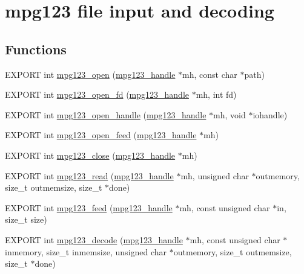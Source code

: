 \hypertarget{group__mpg123__input}{}\section{mpg123 file input and decoding}
\label{group__mpg123__input}
\subsection*{Functions}
\begin{DoxyCompactItemize}
\item 
E\+X\+P\+O\+RT int \hyperlink{group__mpg123__input_gaf36f3b37e964dd0409b468c71c7c5f4e}{mpg123\+\_\+open} (\hyperlink{group__mpg123__init_ga6728e2839a395f3a07d4514da659faca}{mpg123\+\_\+handle} $\ast$mh, const char $\ast$path)
\item 
E\+X\+P\+O\+RT int \hyperlink{group__mpg123__input_gaf205cf0e2c2a6612f564b17d50d227f4}{mpg123\+\_\+open\+\_\+fd} (\hyperlink{group__mpg123__init_ga6728e2839a395f3a07d4514da659faca}{mpg123\+\_\+handle} $\ast$mh, int fd)
\item 
E\+X\+P\+O\+RT int \hyperlink{group__mpg123__input_gad6637826d5288242db3eef0ba6c421ba}{mpg123\+\_\+open\+\_\+handle} (\hyperlink{group__mpg123__init_ga6728e2839a395f3a07d4514da659faca}{mpg123\+\_\+handle} $\ast$mh, void $\ast$iohandle)
\item 
E\+X\+P\+O\+RT int \hyperlink{group__mpg123__input_gafa7b573253221fa87df7087110529cce}{mpg123\+\_\+open\+\_\+feed} (\hyperlink{group__mpg123__init_ga6728e2839a395f3a07d4514da659faca}{mpg123\+\_\+handle} $\ast$mh)
\item 
E\+X\+P\+O\+RT int \hyperlink{group__mpg123__input_ga1c86c6042807ab7734b67a829ee7a2e7}{mpg123\+\_\+close} (\hyperlink{group__mpg123__init_ga6728e2839a395f3a07d4514da659faca}{mpg123\+\_\+handle} $\ast$mh)
\item 
E\+X\+P\+O\+RT int \hyperlink{group__mpg123__input_ga5948710fab983a1c0e0464683207c70c}{mpg123\+\_\+read} (\hyperlink{group__mpg123__init_ga6728e2839a395f3a07d4514da659faca}{mpg123\+\_\+handle} $\ast$mh, unsigned char $\ast$outmemory, size\+\_\+t outmemsize, size\+\_\+t $\ast$done)
\item 
E\+X\+P\+O\+RT int \hyperlink{group__mpg123__input_gae9a90a4e3ceeafe701df26c2fd761f3f}{mpg123\+\_\+feed} (\hyperlink{group__mpg123__init_ga6728e2839a395f3a07d4514da659faca}{mpg123\+\_\+handle} $\ast$mh, const unsigned char $\ast$in, size\+\_\+t size)
\item 
E\+X\+P\+O\+RT int \hyperlink{group__mpg123__input_gad35309fe0892d534b6430e3bfde68358}{mpg123\+\_\+decode} (\hyperlink{group__mpg123__init_ga6728e2839a395f3a07d4514da659faca}{mpg123\+\_\+handle} $\ast$mh, const unsigned char $\ast$inmemory, size\+\_\+t inmemsize, unsigned char $\ast$outmemory, size\+\_\+t outmemsize, size\+\_\+t $\ast$done)

\end{DoxyCompactItemize}
